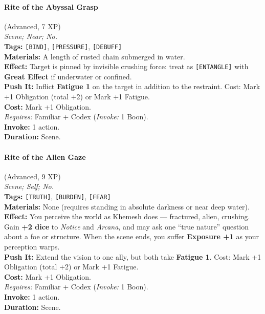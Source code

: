 \paragraph{Rite of the Abyssal Grasp} (Advanced, 7 XP) \hfill \\
\emph{Scene; Near; No.} \\
\textbf{Tags:} \texttt{[BIND]}, \texttt{[PRESSURE]}, \texttt{[DEBUFF]} \\
\textbf{Materials:} A length of rusted chain submerged in water. \\
\textbf{Effect:} Target is pinned by invisible crushing force: treat as \texttt{[ENTANGLE]} with \textbf{Great Effect} if underwater or confined. \\
\textbf{Push It:} Inflict \textbf{Fatigue 1} on the target in addition to the restraint. Cost: Mark +1 Obligation (total +2) or Mark +1 Fatigue. \\
\textbf{Cost:} Mark +1 Obligation. \\
\textit{Requires:} Familiar + Codex (\textit{Invoke:} 1 Boon). \\
\textbf{Invoke:} 1 action. \\
\textbf{Duration:} Scene.

\paragraph{Rite of the Alien Gaze} (Advanced, 9 XP) \hfill \\
\emph{Scene; Self; No.} \\
\textbf{Tags:} \texttt{[TRUTH]}, \texttt{[BURDEN]}, \texttt{[FEAR]} \\
\textbf{Materials:} None (requires standing in absolute darkness or near deep water). \\
\textbf{Effect:} You perceive the world as Khemesh does --- fractured, alien, crushing. Gain \textbf{+2 dice} to \textit{Notice} and \textit{Arcana}, and may ask one ``true nature'' question about a foe or structure. When the scene ends, you suffer \textbf{Exposure +1} as your perception warps. \\
\textbf{Push It:} Extend the vision to one ally, but both take \textbf{Fatigue 1}. Cost: Mark +1 Obligation (total +2) or Mark +1 Fatigue. \\
\textbf{Cost:} Mark +1 Obligation. \\
\textit{Requires:} Familiar + Codex (\textit{Invoke:} 1 Boon). \\
\textbf{Invoke:} 1 action. \\
\textbf{Duration:} Scene.

